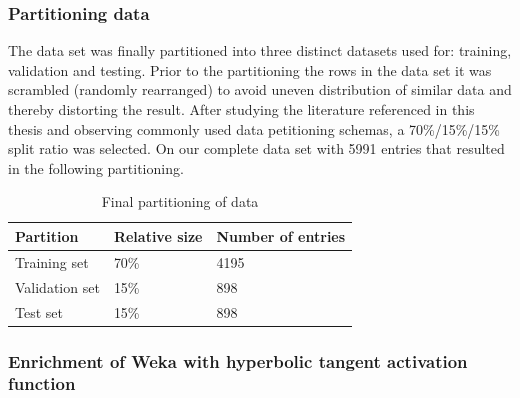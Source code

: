 \subsubsection{Partitioning data} \label{sss:data_partitioning}
The data set was finally partitioned into three distinct datasets used for: training, validation and testing. Prior to the partitioning the rows in the data set it was scrambled (randomly rearranged) to avoid uneven distribution of similar data and thereby distorting the result. After studying the literature referenced in this thesis and observing commonly used data petitioning schemas, a 70\%/15\%/15\% split ratio was selected. On our complete data set with 5991 entries that resulted in the following partitioning.
\begin{table}[H]
\begin{tabular}{ | l | l | l | }
\hline
Partition & Relative size & Number of entries \\
\hline
\hline
Training set & 70\% & 4195 \\
Validation set & 15\% & 898 \\
Test set & 15\% & 898 \\
\hline
\end{tabular}
\caption{Final partitioning of data}
\label{tab:data_partitioning}
\end{table}  

\subsubsection{Enrichment of Weka with hyperbolic tangent activation function} \label{sss:weka_tanh}



